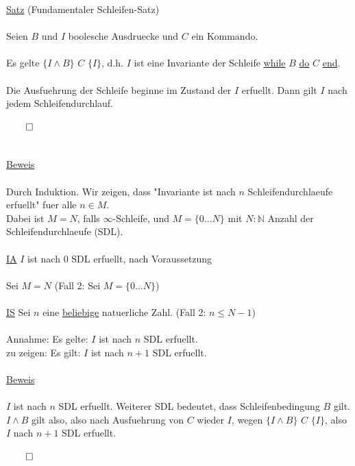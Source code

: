 \documentclass[18pt,a4paper]{article}
\begin{document}
\uline{Satz} (Fundamentaler Schleifen-Satz)\\
\\
Seien $B$ und $I$ boolesche Ausdruecke und $C$ ein Kommando.\\
\\
Es gelte $\{ I \wedge B \}$ $C$ $\{ I \}$, d.h. $I$ ist eine Invariante der Schleife \uline{while} $B$ \uline{do} $C$ \uline{end}.\\
\\
Die Ausfuehrung der Schleife beginne im Zustand der $I$ erfuellt. Dann gilt $I$ nach jedem Schleifendurchlauf.\\
\\
$\qed$\\
\\
\\
\uline{Beweis}\\
\\
Durch Induktion. Wir zeigen, dass "Invariante ist nach $n$ Schleifendurchlaeufe erfuellt" fuer alle $n \in M$.\\
Dabei ist $M = N$, falls $\infty$-Schleife, und $M = \{ 0 ... N \} $ mit $N : \mathbb{N}$ Anzahl der Schleifendurchlaeufe (SDL).\\
\\
\uline{IA} $I$ ist nach $0$ SDL erfuellt, nach Voraussetzung\\
\\
Sei $M=N$ (Fall 2: Sei $M = \{ 0 ... N \} $)\\
\\
\uline{IS} Sei $n$ eine \uline{beliebige} natuerliche Zahl. (Fall 2: $n \leqslant N-1$)\\
\\
Annahme: Es gelte: $I$ ist nach $n$ SDL erfuellt.\\
zu zeigen: Es gilt: $I$ ist nach $n+1$ SDL erfuellt.\\
\\
\uline{Beweis}\\
\\
$I$ ist nach $n$ SDL erfuellt. Weiterer SDL bedeutet, dass Schleifenbedingung $B$ gilt.\\
$I \wedge B$ gilt also, also nach Ausfuehrung von $C$ wieder $I$, wegen $\{ I \wedge B \}$ $C$ $\{ I \} $, also\\
$I$ nach $n+1$ SDL erfuellt.\\
\\
$\qed$\\
\\
\\
\end{document}
